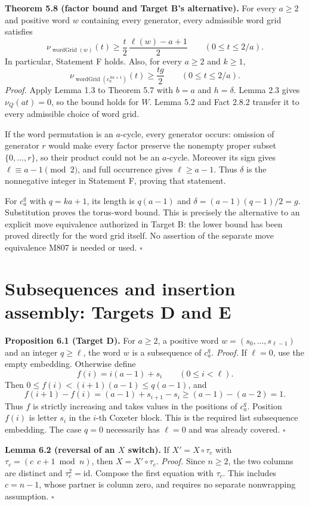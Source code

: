 \documentclass[11pt,a4paper]{article}
\begin{document}
\textbf{Theorem 5.8 (factor bound and Target B's alternative).}
For every $a\ge2$ and positive word $w$ containing every
generator, every admissible word grid satisfies
\[
\nu_{\operatorname{wordGrid}(w)}(t)
\ge\frac{t}{2}\,\frac{\ell(w)-a+1}{2}
\qquad(0\le t\le2/a).
\]
In particular, Statement F holds. Also, for every $a\ge2$
and $k\ge1$,
\[
\nu_{\operatorname{wordGrid}(c_a^{\,ka+1})}(t)
\ge\frac{tg}{2}\qquad(0\le t\le2/a).
\]
\textit{Proof.}
Apply Lemma 1.3 to Theorem 5.7 with $b=a$ and $h=\delta$.
Lemma 2.3 gives $\nu_Q(at)=0$, so the bound holds for $W$.
Lemma 5.2 and Fact 2.8.2 transfer it to every admissible
choice of word grid.

If the word permutation is an $a$-cycle, every generator
occurs: omission of generator $r$ would make every factor
preserve the nonempty proper subset $\{0,\ldots,r\}$, so
their product could not be an $a$-cycle. Moreover its sign
gives $\ell\equiv a-1\pmod2$, and full occurrence gives
$\ell\ge a-1$. Thus $\delta$ is the nonnegative integer
in Statement F, proving that statement.

For $c_a^q$ with $q=ka+1$, its length is $q(a-1)$ and
$\delta=(a-1)(q-1)/2=g$. Substitution proves the torus-word
bound. This is precisely the alternative to an explicit
move equivalence authorized in Target B: the lower bound
has been proved directly for the word grid itself. No
assertion of the separate move equivalence M807 is needed
or used. $\square$

\section{Subsequences and insertion assembly: Targets D and E}

\textbf{Proposition 6.1 (Target D).}
For $a\ge2$, a positive word $w=(s_0,\ldots,s_{\ell-1})$
and an integer $q\ge\ell$, the word $w$ is a subsequence
of $c_a^q$.
\textit{Proof.}
If $\ell=0$, use the empty embedding. Otherwise define
\[
f(i)=i(a-1)+s_i\qquad(0\le i<\ell).
\]
Then $0\le f(i)<(i+1)(a-1)\le q(a-1)$, and
\[
f(i+1)-f(i)=(a-1)+s_{i+1}-s_i
\ge(a-1)-(a-2)=1.
\]
Thus $f$ is strictly increasing and takes values in the
positions of $c_a^q$. Position $f(i)$ is letter $s_i$ in
the $i$-th Coxeter block. This is the required list
subsequence embedding. The case $q=0$ necessarily has
$\ell=0$ and was already covered. $\square$

\textbf{Lemma 6.2 (reversal of an $X$ switch).}
If $X'=X\circ\tau_c$ with $\tau_c=(c\ \ c+1\bmod n)$,
then $X=X'\circ\tau_c$.
\textit{Proof.}
Since $n\ge2$, the two columns are distinct and
$\tau_c^2=\mathrm{id}$. Compose the first equation with
$\tau_c$. This includes $c=n-1$, whose partner is column
zero, and requires no separate nonwrapping assumption.
$\square$
\end{document}
